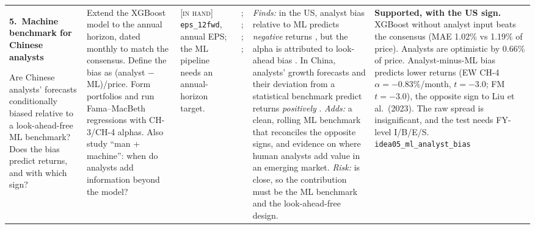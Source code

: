 \documentclass[10pt]{article}
\newcommand{\idea}[2]{\textbf{#1.\ #2}\par\smallskip}
\newcommand{\inhand}{\textsc{[in hand]}}
\begin{document}
{\begin{longtable}{@{}L{3.2cm}L{4.4cm}L{2.5cm}L{3.0cm}L{5.4cm}L{5.8cm}@{}}
\idea{5}{Machine benchmark for Chinese analysts}
Are Chinese analysts' forecasts conditionally biased relative to a look-ahead-free ML benchmark? Does the bias
predict returns, and with which sign?
&
Extend the XGBoost model to the annual horizon, dated monthly to match the consensus. Define the bias as (analyst
$-$ ML)/price. Form portfolios and run Fama--MacBeth regressions with CH-3/CH-4 alphas. Also study ``man + machine'':
when do analysts add information beyond the model?
&
\inhand{} \texttt{eps\_12fwd}, annual EPS; the ML pipeline needs an annual-horizon target.
&
\citet{vanbinsbergen2023}; \citet{zhang2025}; \citet{liu2023pbfj}; \citet{cao2024}; \citet{campbell2026}
&
\emph{Finds:} in the US, analyst bias relative to ML predicts \emph{negative} returns \citep{vanbinsbergen2023}, but
the alpha is attributed to look-ahead bias \citep{zhang2025}. In China, analysts' growth forecasts and their deviation
from a statistical benchmark predict returns \emph{positively} \citep{liu2023pbfj}. \emph{Adds:} a clean, rolling ML
benchmark that reconciles the opposite signs, and evidence on where human analysts add value in an emerging market.
\emph{Risk:} \citet{liu2023pbfj} is close, so the contribution must be the ML benchmark and the look-ahead-free
design.
&
\textbf{Supported, with the US sign.} XGBoost without analyst input beats the consensus (MAE 1.02\% vs 1.19\% of price). Analysts are optimistic by 0.66\% of price. Analyst-minus-ML bias predicts lower returns (EW CH-4 $\alpha=-0.83\%$/month, $t=-3.0$; FM $t=-3.0$), the opposite sign to Liu et al.\ (2023). The raw spread is insignificant, and the test needs FY-level I/B/E/S. \texttt{idea05\_ml\_analyst\_bias}\\[4pt]


\end{longtable}}
\end{document}
